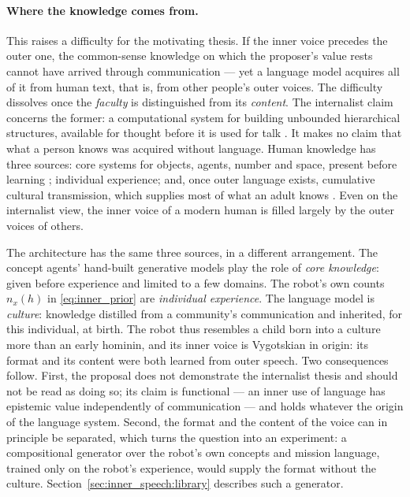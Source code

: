 \paragraph{Where the knowledge comes from.}
This raises a difficulty for the motivating thesis. If the inner voice precedes the outer one, the common-sense
knowledge on which the proposer's value rests cannot have arrived through communication --- yet a language model
acquires all of it from human text, that is, from other people's outer voices. The difficulty dissolves once the
\emph{faculty} is distinguished from its \emph{content}. The internalist claim concerns the former: a
computational system for building unbounded hierarchical structures, available for thought before it is used for
talk \cite{hauser2002faculty, berwick2016why}. It makes no claim that what a person knows was acquired without
language. Human knowledge has three sources: core systems for objects, agents, number and space, present before
learning \cite{spelke2007core}; individual experience; and, once outer language exists, cumulative cultural
transmission, which supplies most of what an adult knows \cite{tomasello1999cultural}. Even on the internalist
view, the inner voice of a modern human is filled largely by the outer voices of others.

The architecture has the same three sources, in a different arrangement. The concept agents' hand-built generative
models play the role of \emph{core knowledge}: given before experience and limited to a few domains. The robot's
own counts $n_x(h)$ in \eqref{eq:inner_prior} are \emph{individual experience}. The language model is
\emph{culture}: knowledge distilled from a community's communication and inherited, for this individual, at birth.
The robot thus resembles a child born into a culture more than an early hominin, and its inner voice is Vygotskian
in origin: its format and its content were both learned from outer speech. Two consequences follow. First, the
proposal does not demonstrate the internalist thesis and should not be read as doing so; its claim is functional
--- an inner use of language has epistemic value independently of communication --- and holds whatever the origin of
the language system. Second, the format and the content of the voice can in principle be separated, which turns the
question into an experiment: a compositional generator over the robot's own concepts and mission language, trained
only on the robot's experience, would supply the format without the culture. Section~\ref{sec:inner_speech:library}
describes such a generator.

